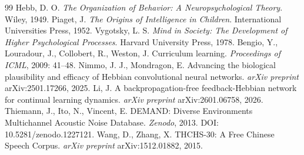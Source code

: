 \documentclass[UTF8,zihao=5,a4paper]{ctexart}
\begin{document}
\begin{thebibliography}{99}
 Hebb, D. O. \textit{The Organization of Behavior: A Neuropsychological Theory}. Wiley, 1949.
 Piaget, J. \textit{The Origins of Intelligence in Children}. International Universities Press, 1952.
 Vygotsky, L. S. \textit{Mind in Society: The Development of Higher Psychological Processes}. Harvard University Press, 1978.
 Bengio, Y., Louradour, J., Collobert, R., Weston, J. Curriculum learning. \textit{Proceedings of ICML}, 2009: 41--48.
 Nimmo, J. J., Mondragon, E. Advancing the biological plausibility and efficacy of Hebbian convolutional neural networks. \textit{arXiv preprint} arXiv:2501.17266, 2025.
 Li, J. A backpropagation-free feedback-Hebbian network for continual learning dynamics. \textit{arXiv preprint} arXiv:2601.06758, 2026.
 Thiemann, J., Ito, N., Vincent, E. DEMAND: Diverse Environments Multichannel Acoustic Noise Database. \textit{Zenodo}, 2013. DOI: 10.5281/zenodo.1227121.
 Wang, D., Zhang, X. THCHS-30: A Free Chinese Speech Corpus. \textit{arXiv preprint} arXiv:1512.01882, 2015.
\end{thebibliography}
\endgroup
\end{document}
